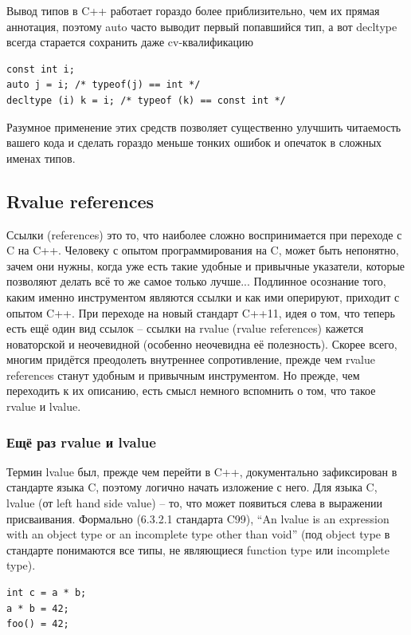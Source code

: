 \documentclass[a4paper,12pt,oneside]{article}
\begin{document}
Вывод типов в C++ работает гораздо более приблизительно, чем их прямая аннотация, поэтому auto часто выводит первый попавшийся тип, а вот decltype всегда старается сохранить даже cv-квалификацию

\begin{lstlisting}
const int i;
auto j = i; /* typeof(j) == int */
decltype (i) k = i; /* typeof (k) == const int */
\end{lstlisting}

Разумное применение этих средств позволяет существенно улучшить читаемость вашего кода и сделать гораздо меньше тонких ошибок и опечаток в сложных именах типов.

\subsection{Rvalue references}

Ссылки (references) это то, что наиболее сложно воспринимается при переходе с C на C++. Человеку с опытом программирования на C, может быть непонятно, зачем они нужны, когда уже есть такие удобные и привычные указатели, которые позволяют делать всё то же самое только лучше... Подлинное осознание того, каким именно инструментом являются ссылки и как ими оперируют, приходит с опытом C++. При переходе на новый стандарт C++11, идея о том, что теперь есть ещё один вид ссылок -- ссылки на rvalue (rvalue references) кажется новаторской и неочевидной (особенно неочевидна её полезность). Скорее всего, многим придётся преодолеть внутреннее сопротивление, прежде чем rvalue references станут удобным и привычным инструментом. Но прежде, чем переходить к их описанию, есть смысл немного вспомнить о том, что такое rvalue и lvalue.

\subsubsection{Ещё раз rvalue и lvalue}

Термин lvalue был, прежде чем перейти в C++, документально зафиксирован в стандарте языка C, поэтому логично начать изложение с него. Для языка C, lvalue (от left hand side value) -- то, что может появиться слева в выражении присваивания. Формально (6.3.2.1 стандарта C99), ``An lvalue is an expression with an object type or an incomplete type other than void'' (под object type в стандарте понимаются все типы, не являющиеся function type или incomplete type).

\begin{lstlisting}
int c = a * b;
a * b = 42;
foo() = 42;
\end{lstlisting}
\end{document}
